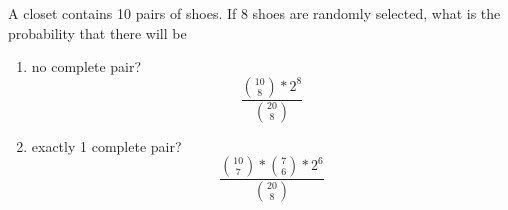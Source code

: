 \item A closet contains 10 pairs of shoes. If 8 shoes are randomly selected, what is the probability that there will be
\begin{enumerate}
    \item no complete pair?
    \[ \frac{\binom{10}{8} * 2^8}{\binom{20}{8}} \]
    \item exactly 1 complete pair?
    \[ \frac{\binom{10}{7} * \binom{7}{6} * 2^6}{\binom{20}{8}} \]
\end{enumerate}